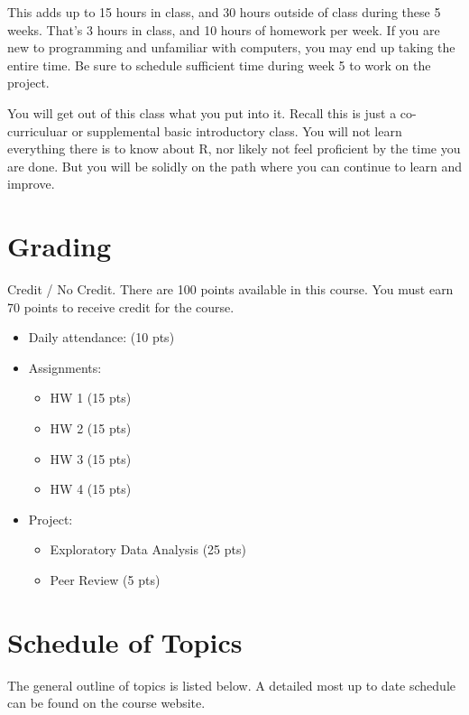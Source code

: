 \documentclass[11pt,]{article}
\providecommand{\tightlist}{%
  \setlength{\itemsep}{0pt}\setlength{\parskip}{0pt}}
\begin{document}
This adds up to 15 hours in class, and 30 hours outside of class during
these 5 weeks. That's 3 hours in class, and 10 hours of homework per
week. If you are new to programming and unfamiliar with computers, you
may end up taking the entire time. Be sure to schedule sufficient time
during week 5 to work on the project.

You will get out of this class what you put into it. Recall this is just
a co-curriculuar or supplemental basic introductory class. You will not
learn everything there is to know about R, nor likely not feel
proficient by the time you are done. But you will be solidly on the path
where you can continue to learn and improve.

\hypertarget{grading}{%
\section{Grading}\label{grading}}

Credit / No Credit. There are 100 points available in this course. You
must earn 70 points to receive credit for the course.

\begin{itemize}
\tightlist
\item
  Daily attendance: (10 pts)
\item
  Assignments:

  \begin{itemize}
  \tightlist
  \item
    HW 1 (15 pts)
  \item
    HW 2 (15 pts)
  \item
    HW 3 (15 pts)
  \item
    HW 4 (15 pts)
  \end{itemize}
\item
  Project:

  \begin{itemize}
  \tightlist
  \item
    Exploratory Data Analysis (25 pts)
  \item
    Peer Review (5 pts)
  \end{itemize}
\end{itemize}

\hypertarget{schedule-of-topics}{%
\section{Schedule of Topics}\label{schedule-of-topics}}

The general outline of topics is listed below. A detailed most up to
date schedule can be found on the course website.
\end{document}
